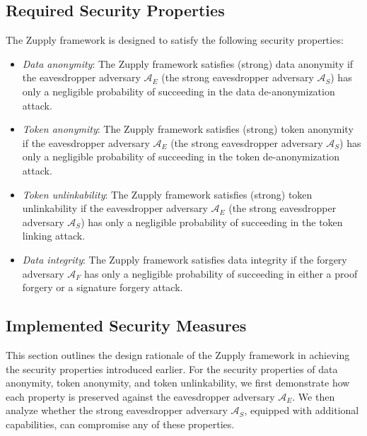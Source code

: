 \subsection{Required Security Properties} \label{sec:Required Security Properties}
The Zupply framework is designed to satisfy the following security properties:
\begin{itemize}
\item \textit{Data anonymity}: The Zupply framework satisfies (strong) data anonymity if the eavesdropper adversary $\mathcal{A}_E$ (the strong eavesdropper adversary $\mathcal{A}_S$) has only a negligible probability of succeeding in the data de-anonymization attack.
\item \textit{Token anonymity}: The Zupply framework satisfies (strong) token anonymity if the eavesdropper adversary $\mathcal{A}_E$ (the strong eavesdropper adversary $\mathcal{A}_S$) has only a negligible probability of succeeding in the token de-anonymization attack.

\item \textit{Token unlinkability}: The Zupply framework satisfies (strong) token unlinkability if the eavesdropper adversary $\mathcal{A}_E$ (the strong eavesdropper adversary $\mathcal{A}_S$) has only a negligible probability of succeeding in the token linking attack.

\item \textit{Data integrity}: The Zupply framework satisfies data integrity if the forgery adversary $\mathcal{A}_F$ has only a negligible probability of succeeding in either a proof forgery or a signature forgery attack.

\end{itemize}

\subsection{Implemented Security Measures} \label{sec:Implemented Security Measures}

This section outlines the design rationale of the Zupply framework in achieving the security properties introduced earlier. 
For the security properties of data anonymity, token anonymity, and token unlinkability, we first demonstrate how each property is preserved against the eavesdropper adversary $\mathcal{A}_E$. We then analyze whether the strong eavesdropper adversary $\mathcal{A}_S$, equipped with additional capabilities, can compromise any of these properties. 


